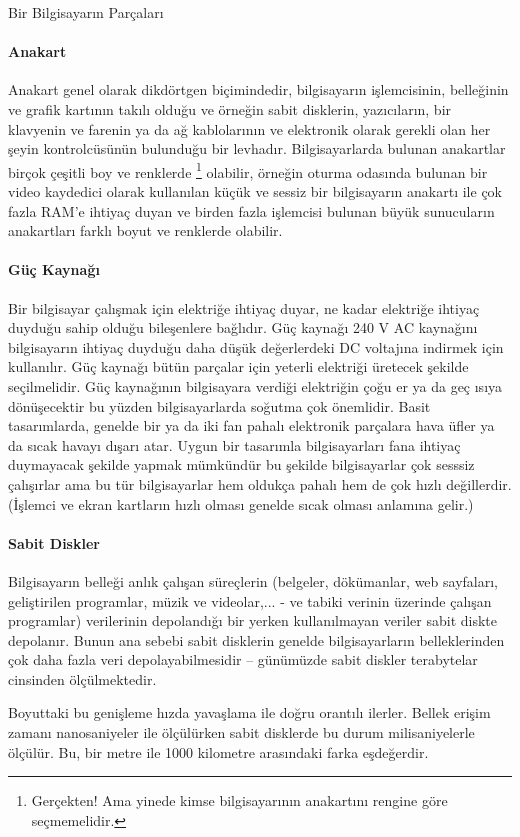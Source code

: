 \documentclass[10pt,a5paper]{book}
\begin{document}
\begin{section}{Bir Bilgisayarın Parçaları}
\paragraph{Anakart}{Anakart genel olarak dikdörtgen biçimindedir, bilgisayarın işlemcisinin, belleğinin ve grafik kartının takılı olduğu ve örneğin sabit disklerin, yazıcıların, bir klavyenin ve farenin ya da ağ kablolarının ve elektronik olarak gerekli olan her şeyin kontrolcüsünün bulunduğu bir levhadır. Bilgisayarlarda bulunan anakartlar birçok çeşitli boy ve renklerde 
\footnote{Gerçekten! Ama yinede kimse bilgisayarının anakartını rengine göre seçmemelidir.}
olabilir, örneğin oturma odasında bulunan bir video kaydedici olarak kullanılan küçük ve sessiz bir bilgisayarın anakartı ile çok fazla RAM'e ihtiyaç duyan ve birden fazla işlemcisi bulunan büyük sunucuların anakartları farklı boyut ve renklerde olabilir.}
\paragraph{Güç Kaynağı}{Bir bilgisayar çalışmak için elektriğe ihtiyaç duyar, ne kadar elektriğe ihtiyaç duyduğu sahip olduğu bileşenlere bağlıdır. Güç kaynağı 240 V AC kaynağını bilgisayarın ihtiyaç duyduğu daha düşük değerlerdeki DC voltajına indirmek için kullanılır. Güç kaynağı bütün parçalar için yeterli elektriği üretecek şekilde seçilmelidir. Güç kaynağının bilgisayara verdiği elektriğin çoğu er ya da geç ısıya dönüşecektir bu yüzden bilgisayarlarda soğutma çok önemlidir. Basit tasarımlarda, genelde bir ya da iki fan pahalı elektronik parçalara hava üfler ya da sıcak havayı dışarı atar. Uygun bir tasarımla bilgisayarları fana ihtiyaç duymayacak şekilde yapmak mümkündür bu şekilde bilgisayarlar çok sesssiz çalışırlar ama bu tür bilgisayarlar hem oldukça pahalı hem de çok hızlı değillerdir. (İşlemci ve ekran kartların hızlı olması genelde sıcak olması anlamına gelir.)}
\paragraph{Sabit Diskler}{Bilgisayarın belleği anlık çalışan süreçlerin (belgeler, dökümanlar, web sayfaları, geliştirilen programlar, müzik ve videolar,... - ve tabiki verinin üzerinde çalışan programlar) verilerinin depolandığı bir yerken kullanılmayan veriler sabit diskte depolanır. Bunun ana sebebi sabit disklerin genelde bilgisayarların belleklerinden çok daha fazla veri depolayabilmesidir – günümüzde sabit diskler terabytelar cinsinden ölçülmektedir.}

Boyuttaki bu genişleme hızda yavaşlama ile doğru orantılı ilerler. Bellek erişim zamanı nanosaniyeler ile ölçülürken sabit disklerde bu durum milisaniyelerle ölçülür. Bu, bir metre ile 1000 kilometre arasındaki farka eşdeğerdir.


\end{section}
\end{document}
